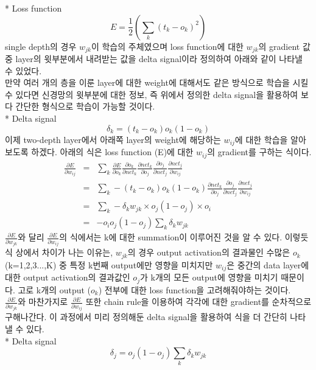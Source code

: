 \documentclass[draft=false]{oblivoir}
\begin{document}
* Loss function
\begin{equation}
E = \frac{1}{2}(\sum_{k}(t_{k}-o_{k})^{2})
\end{equation}
single depth의 경우 $w_{jk}$이 학습의 주체였으며 loss function에 대한 $w_{jk}$의 gradient 값 중 layer의 윗부분에서 내려받는 값을 delta signal이라 정의하여 아래와 같이 나타낼 수 있었다.\\
만약 여러 개의 층을 이룬 layer에 대한 weight에 대해서도 같은 방식으로 학습을 시킬 수 있다면 신경망의 윗부분에 대한 정보, 즉 위에서 정의한 delta signal을 활용하여 보다 간단한 형식으로 학습이 가능할 것이다. \\
* Delta signal
\begin{equation}
\delta_{k} = (t_{k}-o_{k})o_{k}(1-o_{k})
\end{equation}
이제 two-depth layer에서 아래쪽 layer의 weight에 해당하는 $w_{ij}$에 대한 학습을 알아보도록 하겠다. 아래의 식은 loss function (E)에 대한 $w_{ij}$의 gradient를 구하는 식이다.
\begin{eqnarray}
\frac{\partial E}{\partial w_{ij}} & = &  \sum_{k}\frac{\partial E}{\partial o_{k}}\frac{\partial o_{k} }{\partial net_{k}}\frac{\partial net_{k} }{\partial o_{j}}\frac{\partial o_{j}}{\partial net_{j}}\frac{\partial net_{j} }{\partial w_{ij}}\\ 
& = & \sum_{k}-(t_{k}-o_{k})o_{k}(1-o_{k})\frac{\partial net_{k} }{\partial o_{j}}\frac{\partial o_{j}}{\partial net_{j}}\frac{\partial net_{j} }{\partial w_{ij}}\\
& = & \sum_{k}-\delta_{k}w_{jk} \times o_{j}(1-o_{j}) \times o_{i}\\
& = & -o_{i}o_{j}(1-o_{j}) \sum_{k}\delta_{k}w_{jk}
\end{eqnarray}
$\frac{\partial E}{\partial w_{jk}}$와 달리 $\frac{\partial E}{\partial w_{ij}}$의 식에서는 k에 대한 summation이 이루어진 것을 알 수 있다. 이렇듯 식 상에서 차이가 나는 이유는, $w_{jk}$의 경우 output activation의 결과물인 수많은 $o_{k}$ (k=1,2,3...,K) 중 특정 k번째 output에만 영향을 미치지만 $w_{ij}$은 중간의 data layer에 대한 output activation의 결과값인 $o_{j}$가 k개의 모든 output에 영향을 미치기 때문이다. 고로 k개의 output ($o_{k}$) 전부에 대한 loss function을 고려해줘야하는 것이다. \\
$\frac{\partial E}{\partial w_{jk}}$와 마찬가지로 $\frac{\partial E}{\partial w_{ij}}$ 또한 chain rule을 이용하여 각각에 대한 gradient를 순차적으로 구해나간다. 이 과정에서 미리 정의해둔 delta signal을 활용하여 식을 더 간단히 나타낼 수 있다.\\
* Delta signal
\begin{equation}
\delta_{j} = o_{j}(1-o_{j})\sum_{k}\delta_{k}w_{jk}
\end{equation}
\end{document}
